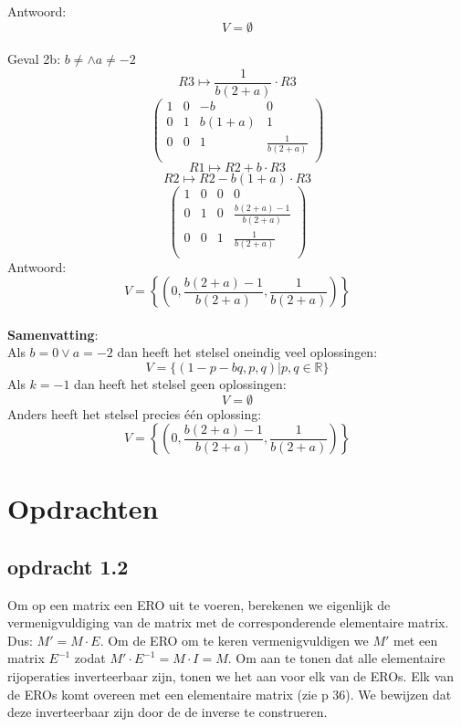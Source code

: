 \documentclass[10pt,a4paper]{article}
\begin{document}
Antwoord:
\[
V=\emptyset
\]\\
Geval 2b: $b\neq \wedge a \neq -2$
\[ R3 \longmapsto \frac{1}{b(2+a)}\cdot R3 \]
\[
\begin{pmatrix}
1 & 0 & -b & 0\\
0 & 1 & b(1+a) & 1\\
0 & 0 & 1 & \frac{1}{b(2+a)}\\
\end{pmatrix}
\]
\[ R1 \longmapsto R2 + b\cdot R3 \]
\[ R2 \longmapsto R2 - b(1+a)\cdot R3 \]
\[
\begin{pmatrix}
1 & 0 & 0 & 0\\
0 & 1 & 0 & \frac{b(2+a)-1}{b(2+a)}\\
0 & 0 & 1 & \frac{1}{b(2+a)}\\
\end{pmatrix}
\]
Antwoord:
\[
V=\left\lbrace\left(0,\frac{b(2+a)-1}{b(2+a)}, \frac{1}{b(2+a)}\right)\right\rbrace
\]\\
\textbf{Samenvatting}:\\
Als  $b=0 \vee a=-2$ dan heeft het stelsel oneindig veel oplossingen:
\[
V = \{ (1-p-bq,p,q) | p,q \in \mathbb{R} \}
\]
Als $k=-1$ dan heeft het stelsel geen oplossingen:
\[
V=\emptyset
\]
Anders heeft het stelsel precies één oplossing:
\[
V=\left\lbrace\left(0,\frac{b(2+a)-1}{b(2+a)}, \frac{1}{b(2+a)}\right)\right\rbrace
\]

\section{Opdrachten}
\subsection*{opdracht 1.2}
Om op een matrix een ERO uit te voeren, berekenen we eigenlijk de vermenigvuldiging van de matrix met de corresponderende elementaire matrix. Dus: $M' = M \cdot E$. Om de ERO om te keren vermenigvuldigen we $M'$ met een matrix $E^{-1}$ zodat $M'\cdot E^{-1} = M \cdot I = M$.
Om aan te tonen dat alle elementaire rijoperaties inverteerbaar zijn, tonen we het aan voor elk van de EROs. Elk van de EROs komt overeen met een elementaire matrix (zie p 36). We bewijzen dat deze inverteerbaar zijn door de de inverse te construeren.
\end{document}
